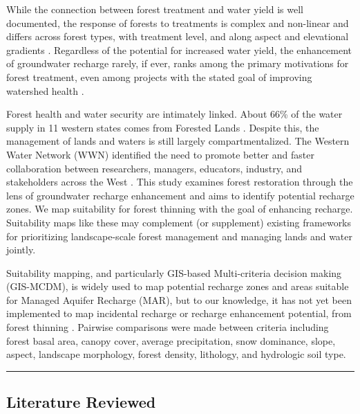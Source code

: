 \documentclass[
  number,
  preprint,
  3p,
  onecolumn]{elsarticle}
\begin{document}
While the connection between forest treatment and water yield is well
documented, the response of forests to treatments is complex and
non-linear and differs across forest types, with treatment level, and
along aspect and elevational gradients
\citep{del_campo_global_2022, biederman_streamflow_2022, zou_streamflow_2010, hibbert1979, moore_physical_2005}.
Regardless of the potential for increased water yield, the enhancement
of groundwater recharge rarely, if ever, ranks among the primary
motivations for forest treatment, even among projects with the stated
goal of improving watershed health
\citep{stanturf2014, filoso2017, allen_ecological_2002, friederici2013, odonnell2016}.

Forest health and water security are intimately linked. About 66\% of
the water supply in 11 western states comes from Forested Lands
\citep{brown_source_2005}. Despite this, the management of lands and
waters is still largely compartmentalized. The Western Water Network
(WWN) identified the need to promote better and faster collaboration
between researchers, managers, educators, industry, and stakeholders
across the West \citep{hansen2024}. This study examines forest
restoration through the lens of groundwater recharge enhancement and
aims to identify potential recharge zones. We map suitability for forest
thinning with the goal of enhancing recharge. Suitability maps like
these may complement (or supplement) existing frameworks for
prioritizing landscape-scale forest management and managing lands and
water jointly.

Suitability mapping, and particularly GIS-based Multi-criteria decision
making (GIS-MCDM), is widely used to map potential recharge zones and
areas suitable for Managed Aquifer Recharge (MAR), but to our knowledge,
it has not yet been implemented to map incidental recharge or recharge
enhancement potential, from forest thinning
\citep{fathi2021, rajashekar2023, rahman2012}. Pairwise comparisons were
made between criteria including forest basal area, canopy cover, average
precipitation, snow dominance, slope, aspect, landscape morphology,
forest density, lithology, and hydrologic soil type.

\begin{center}\rule{0.5\linewidth}{0.5pt}\end{center}

\subsection{Literature Reviewed}\label{literature-reviewed}
\end{document}
